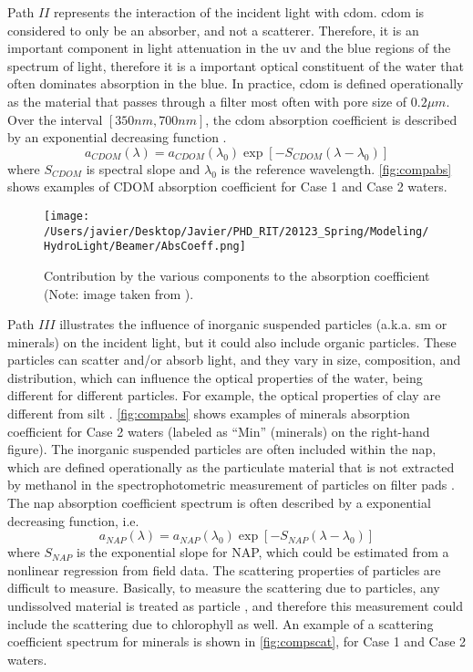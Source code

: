 Path $II$ represents the interaction of the incident light with \gls{cdom}. \gls{cdom} is considered to only be an absorber, and not a scatterer. Therefore, it is an important component in light attenuation in the \gls{uv} and the blue regions of the spectrum of light, therefore it is a important optical constituent of the water that often dominates absorption in the blue. In practice, \gls{cdom} is defined operationally as the material that passes through a filter most often with pore size of $0.2\mu m$. Over the interval $[350nm,700nm]$, the \gls{cdom} absorption coefficient is described by an exponential decreasing function \citep{Jerlov:1976jw,Hojerslev1988}.
\begin{equation}
  a_{CDOM}(\lambda) = a_{CDOM}(\lambda_0)\exp{\left[-S_{CDOM}(\lambda-\lambda_0)\right]}
\end{equation}
where $S_{CDOM}$ is spectral slope and $\lambda_0$ is the reference wavelength. \autoref{fig:compabs} shows examples of CDOM absorption coefficient for Case 1 and Case 2 waters.

\begin{figure}[htb]
\centering
      \texttt{[image: /Users/javier/Desktop/Javier/PHD\_RIT/20123\_Spring/Modeling/HydroLight/Beamer/AbsCoeff.png]}
      \caption{Contribution by the various components to the absorption coefficient (Note: image taken from \citet{Mobley:2001}).}
      \label{fig:compabs}
\end{figure}

Path $III$ illustrates the influence of inorganic suspended particles (a.k.a. \gls{sm} or minerals) on the incident light, but it could also include organic particles. These particles can scatter and/or absorb light, and they vary in size, composition, and distribution, which can influence the optical properties of the water, being different for different particles. For example, the optical properties of clay are different from silt \citep{Pahlevan:2012}. \autoref{fig:compabs} shows examples of minerals absorption coefficient for Case 2 waters (labeled as ``Min'' (minerals) on the right-hand figure). The inorganic suspended particles are often included within the \gls{nap}, which are defined operationally as the particulate material that is not extracted by methanol in the spectrophotometric measurement of particles on filter pads \citep{Kishino1985cj,Mitchell2002}. The \gls{nap} absorption coefficient spectrum is often described by a exponential decreasing function, i.e.
\begin{equation}
  a_{NAP}(\lambda) = a_{NAP}(\lambda_0)\exp{\left[-S_{NAP}(\lambda-\lambda_0)\right]}
\end{equation}
where $S_{NAP}$ is the exponential slope for NAP, which could be estimated from a nonlinear regression from field data. The scattering properties of particles are difficult to measure. Basically, to measure the scattering due to particles, any undissolved material is treated as particle \citep{GeraceThesis}, and therefore this measurement could include the scattering due to chlorophyll as well. An example of a scattering coefficient spectrum for minerals is shown in \autoref{fig:compscat}, for Case 1 and Case 2 waters.

